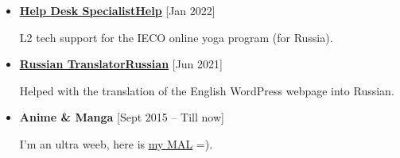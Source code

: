 \begin{itemize}
    \item \textbf{\href{https://www.innerengineering.com/completion}{\underline{Help Desk SpecialistHelp}}}  \hfill {\small [Jan 2022]}
    
    L2 tech support for the IECO online yoga program (for Russia).

    \item \textbf{\href{https://www.ishayoga.eu/index.php/yogaveera-ru/}{\underline{Russian TranslatorRussian}}}  \hfill {\small [Jun 2021]}
    
   Helped with the translation of the English WordPress webpage into Russian.

\end{itemize}

\begin{itemize}
    \item \textbf{Anime \& Manga}
    \hfill
    {\small [Sept 2015 -- Till now]}

    I'm an ultra weeb, here is  \href{https://myanimelist.net/profile/Freik}{\underline{my MAL}} =).
    
    \divider
\end{itemize}
    


